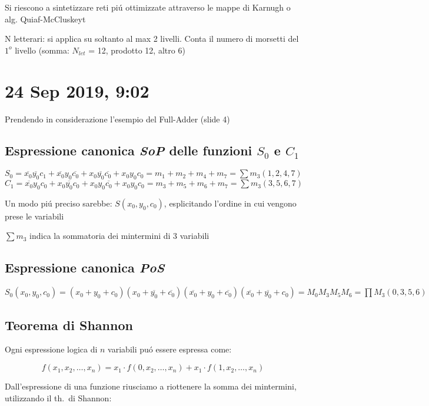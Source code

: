 \documentclass{article}
\begin{document}
Si riescono a sintetizzare reti pi\'u ottimizzate attraverso le mappe di Karnugh o alg. Quiaf-McCluskeyt

N letterari: si applica su soltanto al max 2 livelli. Conta il numero di morsetti del $1^o$ livello (somma: $N_{let}$ = 12, prodotto 12, altro 6)

\newpage
\section{24 Sep 2019,  9:02}
Prendendo in considerazione l'esempio del Full-Adder (slide 4)
\subsection{Espressione canonica \textit{SoP} delle funzioni $S_0$ e $C_1$}
$S_0 = \overline{x_0} \overline{y_0} c_1 + \overline{x_0} y_0 \overline{c_0} + x_0 \overline{y_0} \overline{c_0} + x_0 y_0 c_0 = m_1 + m_2 + m_4 + m_7 = \sum m_3(1, 2, 4, 7)$\\
$C_1 = \overline{x_0} y_0 c_0 + x_0 \overline{y_0} c_0 + x_0 y_0 \overline{c_0} + x_0 y_0 c_0 = m_3 + m_5 + m_6 + m_7 = \sum m_3(3, 5, 6, 7)$

Un modo pi\'u preciso sarebbe: $S(x_0, y_0, c_0) $, esplicitando l'ordine in cui vengono prese le variabili

$\sum m_3$ indica la sommatoria dei mintermini di 3 variabili


\subsection{Espressione canonica \textit{PoS}}

$S_0 (x_0, y_0, c_0) = (x_0 + y_0 + c_0) (x_0 + \overline{y_0} + \overline{c_0}) (\overline{x_0} + y_0 + \overline{c_0}) (\overline{x_0} + \overline{y_0} + c_0) = M_0 M_3 M_5 M_6 = \prod M_3(0, 3, 5, 6)$


\subsection{Teorema di Shannon}
Ogni espressione logica di $n$ variabili pu\'o essere espressa come:

\[f(x_1, x_2, \ldots, x_n) = x_1 \cdot f(0, x_2, \ldots, x_n) + x_1 \cdot f(1, x_2, \ldots, x_n)\]

Dall'espressione di una funzione riusciamo a riottenere la somma dei mintermini, utilizzando il th.\ di Shannon:
\end{document}
